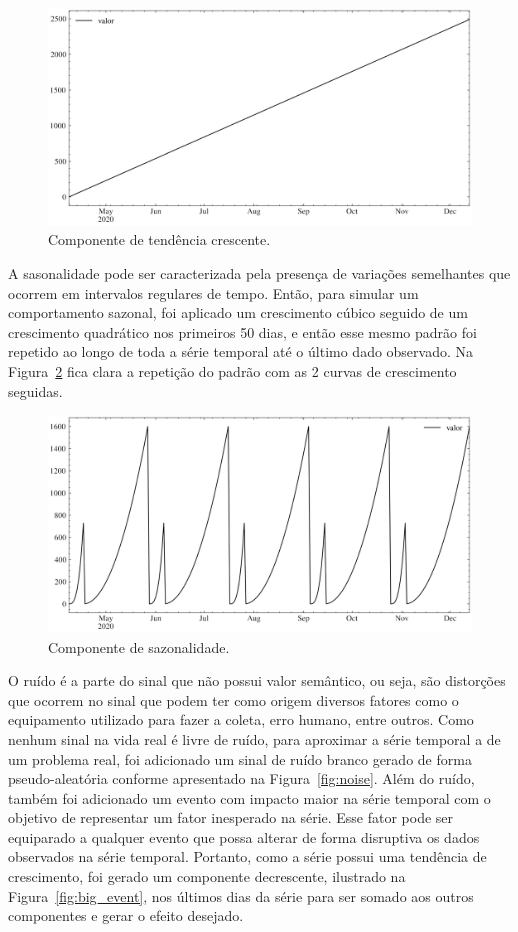 \begin{figure}[!htp]
    \centering
    \includegraphics[width=5.0in]{img/upward_trend.pdf}
    \caption{Componente de tendência crescente.}\label{fig:upward_trend}
\end{figure}

A sasonalidade pode ser caracterizada pela presença de variações semelhantes que ocorrem em intervalos regulares de tempo. Então, para simular um comportamento sazonal, foi aplicado um crescimento cúbico seguido de um crescimento quadrático nos primeiros 50 dias, e então esse mesmo padrão foi repetido ao longo de toda a série temporal até o último dado observado. Na Figura~\ref{fig:seasonal_pattern} fica clara a repetição do padrão com as 2 curvas de crescimento seguidas.

\begin{figure}[!htp]
    \centering
    \includegraphics[width=5.0in]{img/seasonal_pattern.pdf}
    \caption{Componente de sazonalidade.}\label{fig:seasonal_pattern}
\end{figure}

O ruído é a parte do sinal que não possui valor semântico, ou seja, são distorções que ocorrem no sinal que podem ter como origem diversos fatores como o equipamento utilizado para fazer a coleta, erro humano, entre outros. Como nenhum sinal na vida real é livre de ruído, para aproximar a série temporal a de um problema real, foi adicionado um sinal de ruído branco gerado de forma pseudo-aleatória conforme apresentado na Figura~\ref{fig:noise}. Além do ruído, também foi adicionado um evento com impacto maior na série temporal com o objetivo de representar um fator inesperado na série. Esse fator pode ser equiparado a qualquer evento que possa alterar de forma disruptiva os dados observados na série temporal. Portanto, como a série possui uma tendência de crescimento, foi gerado um componente decrescente, ilustrado na Figura~\ref{fig:big_event}, nos últimos dias da série para ser somado aos outros componentes e gerar o efeito desejado.

